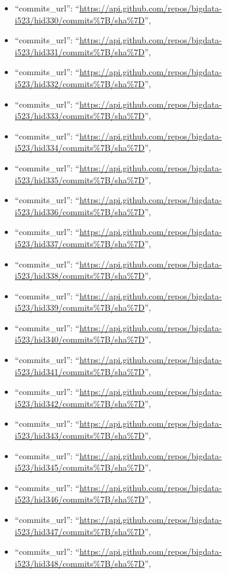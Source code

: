 \begin{itemize}
\item
  ``commits\_url'':
  ``\url{https://api.github.com/repos/bigdata-i523/hid330/commits\%7B/sha\%7D}'',
\item
  ``commits\_url'':
  ``\url{https://api.github.com/repos/bigdata-i523/hid331/commits\%7B/sha\%7D}'',
\item
  ``commits\_url'':
  ``\url{https://api.github.com/repos/bigdata-i523/hid332/commits\%7B/sha\%7D}'',
\item
  ``commits\_url'':
  ``\url{https://api.github.com/repos/bigdata-i523/hid333/commits\%7B/sha\%7D}'',
\item
  ``commits\_url'':
  ``\url{https://api.github.com/repos/bigdata-i523/hid334/commits\%7B/sha\%7D}'',
\item
  ``commits\_url'':
  ``\url{https://api.github.com/repos/bigdata-i523/hid335/commits\%7B/sha\%7D}'',
\item
  ``commits\_url'':
  ``\url{https://api.github.com/repos/bigdata-i523/hid336/commits\%7B/sha\%7D}'',
\item
  ``commits\_url'':
  ``\url{https://api.github.com/repos/bigdata-i523/hid337/commits\%7B/sha\%7D}'',
\item
  ``commits\_url'':
  ``\url{https://api.github.com/repos/bigdata-i523/hid338/commits\%7B/sha\%7D}'',
\item
  ``commits\_url'':
  ``\url{https://api.github.com/repos/bigdata-i523/hid339/commits\%7B/sha\%7D}'',
\item
  ``commits\_url'':
  ``\url{https://api.github.com/repos/bigdata-i523/hid340/commits\%7B/sha\%7D}'',
\item
  ``commits\_url'':
  ``\url{https://api.github.com/repos/bigdata-i523/hid341/commits\%7B/sha\%7D}'',
\item
  ``commits\_url'':
  ``\url{https://api.github.com/repos/bigdata-i523/hid342/commits\%7B/sha\%7D}'',
\item
  ``commits\_url'':
  ``\url{https://api.github.com/repos/bigdata-i523/hid343/commits\%7B/sha\%7D}'',
\item
  ``commits\_url'':
  ``\url{https://api.github.com/repos/bigdata-i523/hid345/commits\%7B/sha\%7D}'',
\item
  ``commits\_url'':
  ``\url{https://api.github.com/repos/bigdata-i523/hid346/commits\%7B/sha\%7D}'',
\item
  ``commits\_url'':
  ``\url{https://api.github.com/repos/bigdata-i523/hid347/commits\%7B/sha\%7D}'',
\item
  ``commits\_url'':
  ``\url{https://api.github.com/repos/bigdata-i523/hid348/commits\%7B/sha\%7D}'',

\end{itemize}
